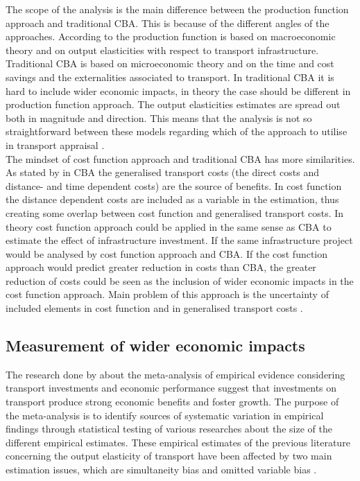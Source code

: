 The scope of the analysis is the main difference between the production function approach and traditional CBA. This is because of the different angles of the approaches. According to \cite{andersson} the production function is based on macroeconomic theory and on output elasticities with respect to transport infrastructure. Traditional CBA is based on microeconomic theory and on the time and cost savings and the externalities associated to transport. In traditional CBA it is hard to include wider economic impacts, in theory the case should be different in production function approach. The output elasticities estimates are spread out both in magnitude and direction. This means that the analysis is not so straightforward between these models regarding which of the approach to utilise in transport appraisal \citep{andersson}. \\

The mindset of cost function approach and traditional CBA has more similarities. As stated by \cite{andersson} in CBA the generalised transport costs (the direct costs and distance- and time dependent costs) are the source of benefits. In cost function the distance dependent costs are included as a variable in the estimation, thus creating some overlap between cost function and generalised transport costs. In theory cost function approach could be applied in the same sense as CBA to estimate the effect of infrastructure investment. If the same infrastructure project would be analysed by cost function approach and CBA. If the cost function approach would predict greater reduction in costs than CBA, the greater reduction of costs could be seen as the inclusion of wider economic impacts in the cost function approach. Main problem of this approach is the uncertainty of included elements in cost function and in generalised transport costs \citep{andersson}.  \\


\subsection{Measurement of wider economic impacts}

The research done by \cite{melo} about the meta-analysis of empirical evidence considering transport investments and economic performance suggest that investments on transport produce strong economic benefits and foster growth. The purpose of the meta-analysis is to identify sources of systematic variation in empirical findings through statistical testing of various researches about the size of the different empirical estimates. These empirical estimates of the previous literature concerning the output elasticity of transport have been affected by two main estimation issues, which are simultaneity bias and omitted variable bias \citep{melo}.  \\
 

